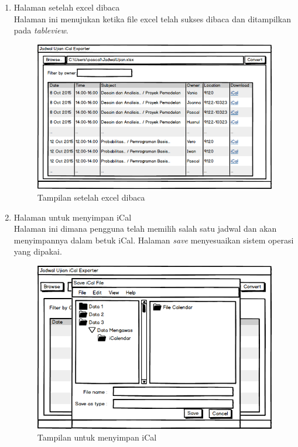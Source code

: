 \begin{enumerate}
	\item Halaman setelah excel dibaca\\
	Halaman ini menujukan ketika file excel telah sukses dibaca dan ditampilkan pada \textit{tableview}.
		\begin{figure}[H]
		\centering
		\includegraphics[scale=0.5]{Gambar/antarmuka2}
		\caption{Tampilan setelah excel dibaca}
		\label{fig:excel_dibaca}
		\end{figure}
	\item Halaman untuk menyimpan iCal\\
	Halaman ini dimana pengguna telah memilih salah satu jadwal dan akan menyimpannya dalam betuk iCal. Halaman \textit{save} menyesuaikan sistem operasi yang dipakai. 
		\begin{figure}[H]
		\centering
		\includegraphics[scale=0.5]{Gambar/antarmuka4}
		\caption{Tampilan untuk menyimpan iCal}
		\label{fig:jadwalpng}
		\end{figure}
\end{enumerate}

